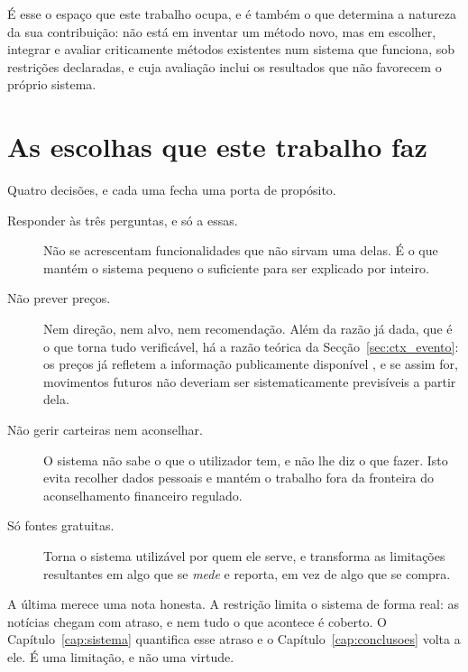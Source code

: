 É esse o espaço que este trabalho ocupa, e é também o que determina a natureza da sua contribuição:
não está em inventar um método novo, mas em escolher, integrar e avaliar criticamente métodos
existentes num sistema que funciona, sob restrições declaradas, e cuja avaliação inclui os
resultados que não favorecem o próprio sistema.

\section{As escolhas que este trabalho faz}
\label{sec:ctx_escolhas}

Quatro decisões, e cada uma fecha uma porta de propósito.

\begin{description}
  \item[Responder às três perguntas, e só a essas.] Não se acrescentam funcionalidades que não
        sirvam uma delas. É o que mantém o sistema pequeno o suficiente para ser explicado por
        inteiro.
  \item[Não prever preços.] Nem direção, nem alvo, nem recomendação. Além da razão já dada, que é o
        que torna tudo verificável, há a razão teórica da Secção~\ref{sec:ctx_evento}: os preços já
        refletem a informação publicamente disponível \autocite{fama1970efficient}, e se assim for,
        movimentos futuros não deveriam ser sistematicamente previsíveis a partir dela.
  \item[Não gerir carteiras nem aconselhar.] O sistema não sabe o que o utilizador tem, e não lhe diz
        o que fazer. Isto evita recolher dados pessoais e mantém o trabalho fora da fronteira do
        aconselhamento financeiro regulado.
  \item[Só fontes gratuitas.] Torna o sistema utilizável por quem ele serve, e transforma as
        limitações resultantes em algo que se \emph{mede} e reporta, em vez de algo que se compra.
\end{description}

A última merece uma nota honesta. A restrição limita o sistema de forma real: as notícias chegam
com atraso, e nem tudo o que acontece é coberto. O Capítulo~\ref{cap:sistema} quantifica esse
atraso e o Capítulo~\ref{cap:conclusoes} volta a ele. É uma limitação, e não uma virtude.
